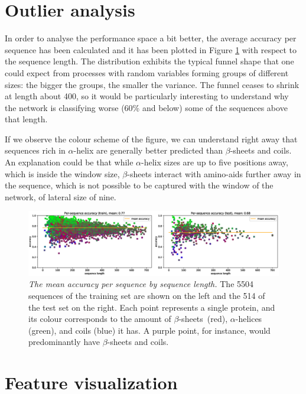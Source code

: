 \section{Outlier analysis} \label{sect:outliers}

In order to analyse the performance space a bit better, the average accuracy per sequence has been calculated and it has been plotted in Figure \ref{fig:per_seq_acc} with respect to the sequence length. The distribution exhibits the typical funnel shape that one could expect from processes with random variables forming groups of different sizes: the bigger the groups, the smaller the variance. The funnel ceases to shrink at length about 400, so it would be particularly interesting to understand why the network is classifying worse (60\% and below) some of the sequences above that length.

If we observe the colour scheme of the figure, we can understand right away that sequences rich in $\alpha$-helix are generally better predicted than $\beta$-sheets and coils. An explanation could be that while $\alpha$-helix sizes are up to five positions away, which is inside the window size, $\beta$-sheets interact with amino-aids further away in the sequence, which is not possible to be captured with the window of the network, of lateral size of nine.

\begin{figure}
\centering
\includegraphics[width=1\linewidth]{Figures/per_seq_acc}
\caption{\textit{The mean accuracy per sequence by sequence length.} The 5504 sequences of the training set are shown on the left and the 514 of the test set on the right. Each point represents a single protein, and its colour corresponds to the amount of $\beta$-sheets~(red), $\alpha$-helices (green), and coils (blue) it has. A purple point, for instance, would predominantly have $\beta$-sheets and coils.}
\label{fig:per_seq_acc}
\end{figure}

\section{Feature visualization}

